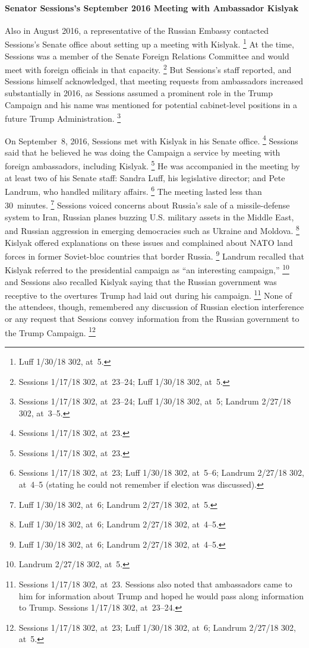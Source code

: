 \paragraph{Senator Sessions's September 2016 Meeting with Ambassador Kislyak}

Also in August 2016, a representative of the Russian Embassy contacted Sessions's Senate office about setting up a meeting with Kislyak.%
\footnote{Luff 1/30/18 302, at~5.}
At the time, Sessions was a member of the Senate Foreign Relations Committee and would meet with foreign officials in that capacity.%
\footnote{Sessions 1/17/18 302, at~23--24;
Luff 1/30/18 302, at~5.}
But Sessions's staff reported, and Sessions himself acknowledged, that meeting requests from ambassadors increased substantially in 2016, as Sessions assumed a prominent role in the Trump Campaign and his name was mentioned for potential cabinet-level positions in a future Trump Administration.%
\footnote{Sessions 1/17/18 302, at~23--24;
Luff 1/30/18 302, at~5;
Landrum 2/27/18 302, at~3--5.}

On September~8, 2016, Sessions met with Kislyak in his Senate office.%
\footnote{Sessions 1/17/18 302, at~23.}
Sessions said that he believed he was doing the Campaign a service by meeting with foreign ambassadors, including Kislyak.%
\footnote{Sessions 1/17/18 302, at~23.}
He was accompanied in the meeting by at least two of his Senate staff: Sandra Luff, his legislative director; and Pete Landrum, who handled military affairs.%
\footnote{Sessions 1/17/18 302, at~23;
Luff 1/30/18 302, at~5--6;
Landrum 2/27/18 302, at~4--5 (stating he could not remember if election was discussed).}
The meeting lasted less than 30~minutes.%
\footnote{Luff 1/30/18 302, at~6;
Landrum 2/27/18 302, at~5.}
Sessions voiced concerns about Russia's sale of a missile-defense system to Iran, Russian planes buzzing U.S. military assets in the Middle East, and Russian aggression in emerging democracies such as Ukraine and Moldova.%
\footnote{Luff 1/30/18 302, at~6;
Landrum 2/27/18 302, at~4--5.}
Kislyak offered explanations on these issues and complained about NATO land forces in former Soviet-bloc countries that border Russia.%
\footnote{Luff 1/30/18 302, at~6;
Landrum 2/27/18 302, at~4--5.}
Landrum recalled that Kislyak referred to the presidential campaign as ``an interesting campaign,''%
\footnote{Landrum 2/27/18 302, at~5.}
and Sessions also recalled Kislyak saying that the Russian government was receptive to the overtures Trump had laid out during his campaign.%
\footnote{Sessions 1/17/18 302, at~23.
Sessions also noted that ambassadors came to him for information about Trump and hoped he would pass along information to Trump.
Sessions 1/17/18 302, at~23--24.}
None of the attendees, though, remembered any discussion of Russian election interference or any request that Sessions convey information from the Russian government to the Trump Campaign.%
\footnote{Sessions 1/17/18 302, at~23;
Luff 1/30/18 302, at~6;
Landrum 2/27/18 302, at~5.}

